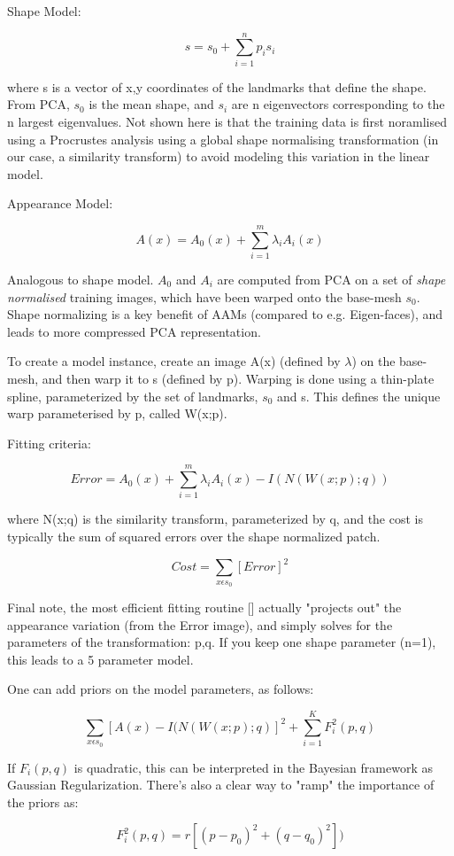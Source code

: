 \documentclass[10pt,twocolumn,letterpaper]{article}
\begin{document}
Shape Model:

\[s = s_0 + \sum_{i=1}^n p_i s_i\]

where s is a vector of x,y coordinates of the landmarks that define the shape.  From PCA, $s_0$ is the mean shape, and $s_i$ are n eigenvectors corresponding to the n largest eigenvalues.  Not shown here is that the training data is first noramlised using a Procrustes analysis using a global shape normalising transformation (in our case, a similarity transform) to avoid modeling this variation in the linear model.

Appearance Model:

\[A(x) = A_0(x) + \sum_{i=1}^m \lambda_i A_i(x)\]

Analogous to shape model. $A_0$ and $A_i$ are computed from PCA on a set of \emph{shape normalised} training images, which have been warped onto the base-mesh $s_0$.  Shape normalizing is a key benefit of AAMs (compared to e.g. Eigen-faces), and leads to more compressed PCA representation.

To create a model instance, create an image A(x) (defined by $\lambda$) on the base-mesh, and then warp it to s (defined by p).  Warping is done using a thin-plate spline, parameterized by the set of landmarks, $s_0$ and s.  This defines the unique warp parameterised by p, called W(x;p).

Fitting criteria:

\[Error = A_0(x) + \sum_{i=1}^m \lambda_i A_i(x) - I(N(W(x;p);q)) \]

where N(x;q) is the similarity transform, parameterized by q, and the cost is typically the sum of squared errors over the shape normalized patch.

\[Cost = \sum_{x \epsilon s_0} [Error]^2 \]

Final note, the most efficient fitting routine [] actually "projects out" the appearance variation (from the Error image), and simply solves for the parameters of the transformation: p,q.  If you keep one shape parameter (n=1), this leads to a 5 parameter model.


One can add priors on the model parameters, as follows:

\[ \sum_{x \epsilon s_0} [A(x) - I(N(W(x;p);q)]^2 + \sum_{i=1}^K F_i^2(p,q) \]

If $F_i(p,q)$ is quadratic, this can be interpreted in the Bayesian framework as Gaussian Regularization.  There's also a clear way to "ramp" the importance of the priors as:

\[ F_i^2(p,q) = r[(p-p_0)^2+(q-q_0)^2]) \]
\end{document}

